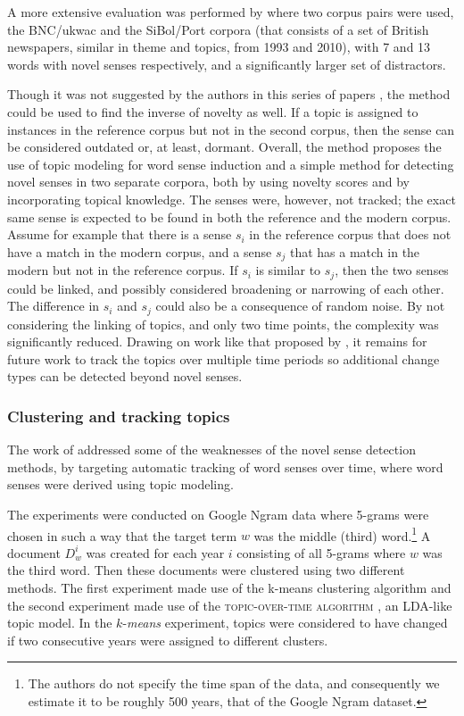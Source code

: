 \documentclass[output=paper]{langsci/langscibook}
\begin{document}
A more extensive evaluation was performed by \citet{cook-etal-2014-novel} where two corpus pairs were used, the BNC/ukwac and the SiBol/Port corpora (that consists of a set of British newspapers, similar in theme and topics, from 1993 and 2010), with 7 and 13 words with novel senses respectively, and a significantly larger set of distractors. 


Though it was not suggested by the authors in this series of papers \citep{lau-etal-2012-word,cook13alexicographic,cook-etal-2014-novel}, the method could be used to find the inverse of novelty as well. If a topic is assigned to instances in the reference corpus but not in the second corpus, then the sense can be considered outdated or, at least, dormant. 
Overall, the method proposes the use of topic modeling for word sense induction and a simple method for detecting novel senses in two separate corpora, both by using novelty scores and by incorporating topical knowledge. The senses were, however, not tracked; the exact same sense is expected to be found in both the reference and the modern corpus. 
Assume for example that there is a sense $s_i$ in the reference corpus that does not have a match in the modern corpus, and a sense $s_j$ that has a match in the modern but not in the reference corpus. If $s_i$ is similar to $s_j$, then the two senses could be linked, and possibly considered broadening or narrowing of each other. The difference in $s_i$ and $s_j$ could also be a consequence of random noise. 
By not considering the linking of topics, and only two time points, the complexity was significantly reduced. Drawing on work like that proposed by \citet{mei_2005}, it remains for future work to track the topics over multiple time periods so additional change types can be detected beyond novel senses. 


\subsubsection{Clustering and tracking topics}
The work of \citet{wijaya2011understanding} addressed some of the weaknesses of the novel sense detection methods, by targeting automatic tracking of word senses over time, where word senses were derived using topic modeling. 

The experiments were conducted on Google Ngram data where 5-grams were chosen in such a way that the target term $w$ was the middle (third) word.\footnote{The authors do not specify the time span of the data, and consequently we estimate it to be roughly 500 years, that of the Google Ngram dataset.} 
A document $D^{i}_w$ was created for each year $i$ consisting of all 5-grams where $w$ was the third word. Then these documents were clustered using two different methods. 
The first experiment made use of the k-means clustering algorithm and 
the second experiment made use of the \textsc{topic-over-time algorithm}  \citep{topicsovertime}, an LDA-like topic model. 
In the $k$-\textit{means} experiment, topics were considered to have changed if two consecutive years were assigned to different clusters.
\end{document}
